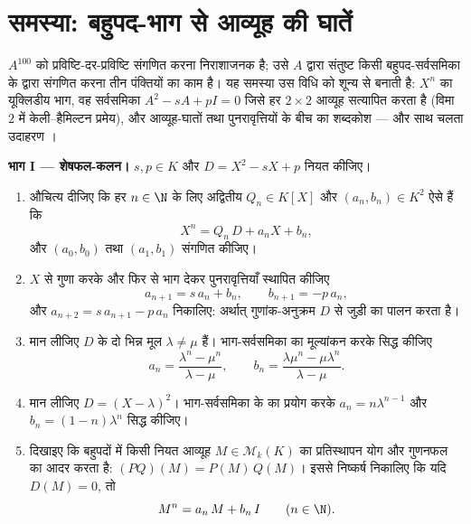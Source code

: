 \section{समस्या: बहुपद-भाग से आव्यूह की घातें}

\begin{problem}\label{pb:b1:matrices:1}
$A^{100}$ को प्रविष्टि-दर-प्रविष्टि संगणित करना निराशाजनक है; उसे $A$ द्वारा
संतुष्ट किसी बहुपद-सर्वसमिका के द्वारा संगणित करना तीन पंक्तियों का काम है।
यह समस्या उस विधि को शून्य से बनाती है: $X^n$ का यूक्लिडीय भाग, वह सर्वसमिका
$A^2 - sA + pI = 0$ जिसे हर $2 \times 2$ आव्यूह सत्यापित करता है (विमा $2$
में केली--हैमिल्टन प्रमेय), और आव्यूह-घातों तथा  पुनरावृत्तियों के बीच
का शब्दकोश --- और साथ चलता उदाहरण ।  

\medskip \noindent\textbf{भाग I --- शेषफल-कलन।} $s, p \in K$ और $D = X^2 -
sX + p$ नियत कीजिए।
\begin{enumerate}
  \item औचित्य दीजिए कि हर $n \in \N$ के लिए अद्वितीय $Q_n \in K[X]$ और
  $(a_n, b_n) \in K^2$ ऐसे हैं कि
        \[
        X^n = Q_n\,D + a_n X + b_n ,
        \]
        और $(a_0, b_0)$ तथा $(a_1, b_1)$ संगणित कीजिए।
  \item $X$ से गुणा करके और फिर से भाग देकर पुनरावृत्तियाँ स्थापित कीजिए
        \[
        a_{n+1} = s\,a_n + b_n,
        \qquad
        b_{n+1} = -p\,a_n ,
        \]
        और $a_{n+2} = s\,a_{n+1} - p\,a_n$ निकालिए: अर्थात् गुणांक-अनुक्रम
        $D$ से जुड़ी  का पालन करता है।
  \item मान लीजिए $D$ के दो भिन्न मूल $\lambda \neq \mu$ हैं। भाग-सर्वसमिका
  का मूल्यांकन करके सिद्ध कीजिए
        \[
        a_n = \frac{\lambda^n - \mu^n}{\lambda - \mu},
        \qquad
        b_n = \frac{\lambda\mu^n - \mu\lambda^n}{\lambda - \mu} .
        \]
  \item मान लीजिए $D = (X - \lambda)^2$। भाग-सर्वसमिका के  का प्रयोग
  करके $a_n = n\lambda^{n-1}$ और $b_n = (1 - n)\lambda^{n}$ सिद्ध कीजिए।
  \item दिखाइए कि बहुपदों में किसी नियत आव्यूह $M \in \mathcal{M}_k(K)$ का
  प्रतिस्थापन योग और गुणनफल का आदर करता है: $(PQ)(M) = P(M)\,Q(M)$। इससे
  निष्कर्ष निकालिए कि यदि $D(M) = 0$, तो
        \[
        M^n = a_n\,M + b_n\,I \qquad (n \in \N).
        \]
\end{enumerate}


\end{problem}

